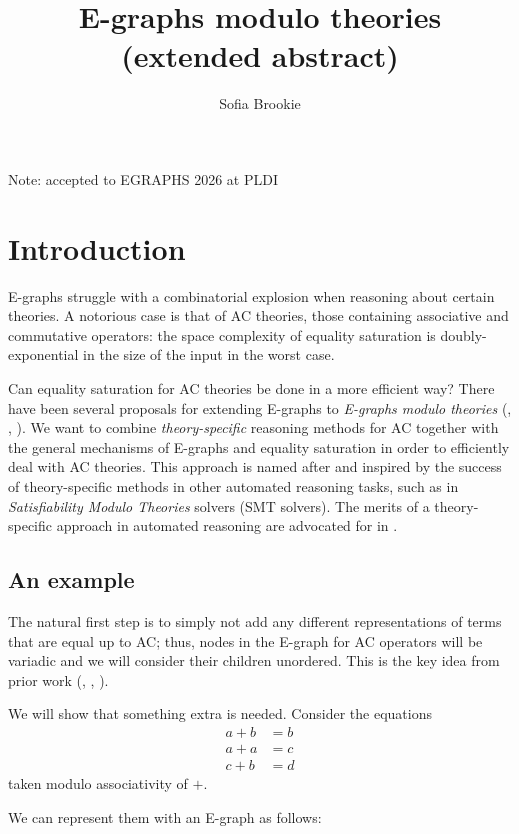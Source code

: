 \documentclass{article}
\title{E-graphs modulo theories (extended abstract)}
\author{Sofia Brookie}
\theoremstyle{definition}
\begin{document}
\maketitle

Note: accepted to EGRAPHS 2026 at PLDI

\section{Introduction}
E-graphs struggle with a combinatorial explosion when reasoning about certain theories. A notorious case is that of AC theories, those containing associative and commutative operators: the space complexity of equality saturation is doubly-exponential in the size of the input in the worst case.

Can equality saturation for AC theories be done in a more efficient way? There have been several proposals for extending E-graphs to \emph{E-graphs modulo theories} (\citep{zucker_omelets_2025_short}, \citep{panchekha_lin-graphs_2025}, \citep{shanabrook_custom_2026}). We want to combine \emph{theory-specific} reasoning methods for AC together with the general mechanisms of E-graphs and equality saturation in order to efficiently deal with AC theories. This approach is named after and inspired by the success of theory-specific methods in other automated reasoning tasks, such as in \emph{Satisfiability Modulo Theories} solvers (SMT solvers). The merits of a theory-specific approach in automated reasoning are advocated for in \citet{goos_little_2002_short}.

\subsection{An example}
The natural first step is to simply not add any different representations of terms that are equal up to AC; thus, nodes in the E-graph for AC operators will be variadic and we will consider their children unordered. This is the key idea from prior work (\citep{zucker_omelets_2025_short}, \citep{panchekha_lin-graphs_2025}, \citep{shanabrook_custom_2026}).

We will show that something extra is needed. Consider the equations
\begin{align}
	a + b &= b \\
	a + a &= c \\
	c + b &= d
\end{align}
taken modulo associativity of $+$.

We can represent them with an E-graph as follows:
\end{document}
